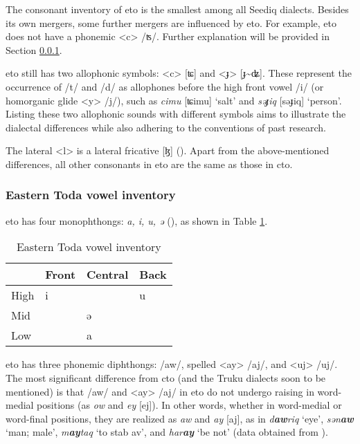 The consonant inventory of \acl{eto} is the smallest among all Seediq dialects. Besides its own mergers, some further mergers are influenced by \acl{eto}. For example, \acl{eto} does not have a phonemic <c> /ʦ/. Further explanation will be provided in Section \ref{}.

\acl{eto} still has two allophonic symbols: <c> [ʨ] and <ɟ> [ɟ\~{ }ʥ]. These represent the occurrence of /t/ and /d/ as allophones before the high front vowel /i/ (or homorganic glide <y> /j/), such as \textit{cimu} [ʨimu] `salt' and \textit{səɟiq} [səɟiq] `person'. Listing these two allophonic sounds with different symbols aims to illustrate the dialectal differences while also adhering to the conventions of past research.

The lateral <l> is a lateral fricative [ɮ] (\cite{lee2012segment,lee2015tawsa}). Apart from the above-mentioned differences, all other consonants in \acl{eto} are the same as those in \acl{cto}.

\subsubsection{Eastern Toda vowel inventory}

\acl{eto} has four monophthongs: \textit{a, i, u, ə} (\cite{lee2012segment,lee2015tawsa}), as shown in Table \ref{tab:etoV}.

\begin{table}[!htbp]
\centering
\caption{Eastern Toda vowel inventory}
\label{tab:etoV}
\begin{tabular}{llll}
\hline
     & Front & Central & Back \\ \hline
High &  i    &         &  u   \\
Mid  &       &  ə      &      \\
Low  &       &  a      &      \\ \hline
\end{tabular}
\end{table}

\acl{eto} has three phonemic diphthongs: /aw/, spelled <ay> /aj/, and <uj> /uj/. The most significant difference from \acl{cto} (and the Truku dialects soon to be mentioned) is that /aw/ and <ay> /aj/ in \acl{eto} do not undergo raising in word-medial positions (as \textit{ow} and \textit{ey} [ej]). In other words, whether in word-medial or word-final positions, they are realized as \textit{aw} and \textit{ay} [aj], as in \textit{d\textbf{aw}riq} `eye', \textit{sən\textbf{aw}} `man; male', \textit{m\textbf{ay}taq} `to stab \acs{av}', and \textit{har\textbf{ay}} `be not' (data obtained from \cite{lee2015tawsa}).

